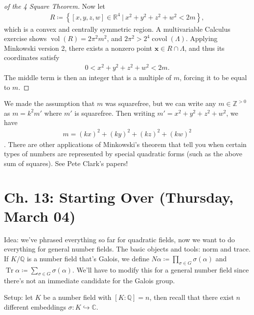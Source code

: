 \begin{proof}[of the 4 Square Theorem]
Now let
\begin{align*}
R \coloneqq\left\{{ {\left[ {x,y,z,w} \right]} \in {\mathbb{R}}^4 {~\mathrel{\Big|}~}x^2 + y^2 + z^2 + w ^2 < 2m  }\right\}
,\end{align*}
which is a convex and centrally symmetric region. A multivariable
Calculus exercise shows \(\operatorname{vol}(R) = 2\pi^2 m^2\), and
\(2\pi^2 > 2^4 \operatorname{covol}( \Lambda)\). Applying Minkowski
version 2, there exists a nonzero point
\(\mathbf{x} \in R \cap\Lambda\), and thus its coordinates satisfy
\begin{align*}
0 < x^2 + y^2 + z^2 + w^2 < 2m
.\end{align*}
The middle term is then an integer that is a multiple of \(m\), forcing
it to be equal to \(m\).

\end{proof}

\begin{remark}

We made the assumption that \(m\) was squarefree, but we can write any
\(m\in {\mathbb{Z}}^{>0}\) as \(m = k^2 m'\) where \(m'\) is squarefree.
Then writing \(m' = x^2 + y^2 + z^2 + w^2\), we have
\begin{align*} m = (kx)^2 + (ky)^2 + (kz)^2 + (kw)^2 \end{align*}
. There are other applications of Minkowski's theorem that tell you when
certain types of numbers are represented by special quadratic forms
(such as the above sum of squares). See Pete Clark's papers!

\end{remark}

\hypertarget{ch.-13-starting-over-thursday-march-04}{%
\section{Ch. 13: Starting Over (Thursday, March
04)}\label{ch.-13-starting-over-thursday-march-04}}

\begin{remark}

Idea: we've phrased everything so far for quadratic fields, now we want
to do everything for general number fields. The basic objects and tools:
norm and trace. If \(K/{\mathbb{Q}}\) is a number field that's Galois,
we define \(N \alpha \coloneqq\prod_{ \sigma \in G} \sigma( \alpha)\)
and
\(\operatorname{Tr}\alpha \coloneqq\sum_{ \sigma\in G } \sigma( \alpha)\).
We'll have to modify this for a general number field since there's not
an immediate candidate for the Galois group.

Setup: let \(K\) be a number field with \([K: {\mathbb{Q}}] = n\), then
recall that there exist \(n\) different embeddings
\(\sigma: K \hookrightarrow{\mathbb{C}}\).

\end{remark}

